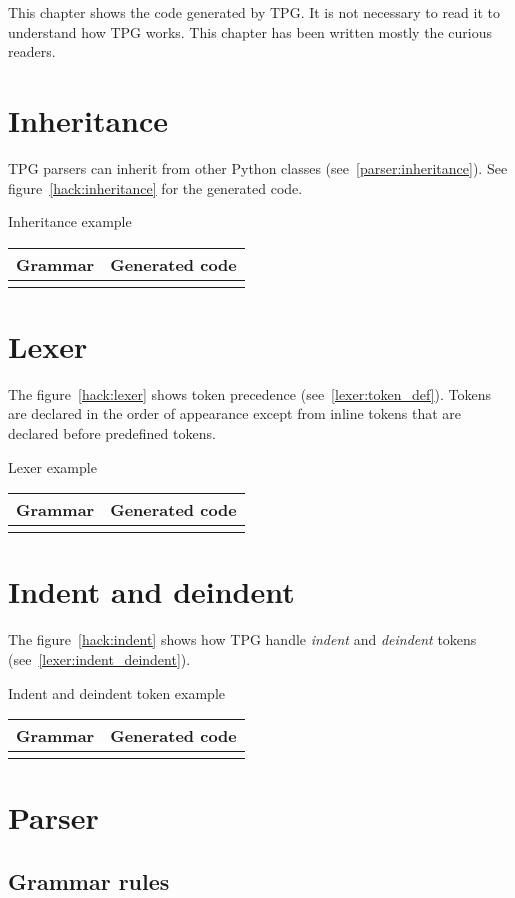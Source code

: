 
\newcommand{\hack}[3]
{
	\begin{tableau}
	\caption{#2}											\label{#3}
	\begin{tabular}{| p{6cm} | p{8cm} | }
	\hline
		Grammar & Generated code \\
	\hline
	\hline
		{ \scriptsize \verbatimtabinput[4]{hack/#1.g} }
		&
		{ \scriptsize \verbatimtabinput[4]{hack/#1.py} }
		\\
	\hline
	\end{tabular}
	\end{tableau}
}

This chapter shows the code generated by TPG.
It is not necessary to read it to understand how TPG works.
This chapter has been written mostly the curious readers.

\section{Inheritance}

TPG parsers can inherit from other Python classes (see~\ref{parser:inheritance}).
See figure~\ref{hack:inheritance} for the generated code.

\hack{baseclasses}{Inheritance example}{hack:inheritance}

\clearpage
\section{Lexer}

The figure~\ref{hack:lexer} shows token precedence (see~\ref{lexer:token_def}).
Tokens are declared in the order of appearance except from inline tokens that are declared before predefined tokens.

\hack{lexer}{Lexer example}{hack:lexer}

\clearpage
\section{Indent and deindent}

The figure~\ref{hack:indent} shows how TPG handle \emph{indent} and \emph{deindent} tokens
(see~\ref{lexer:indent_deindent}).

\hack{indent}{Indent and deindent token example}{hack:indent}

\clearpage
\section{Parser}

\subsection{Grammar rules}

